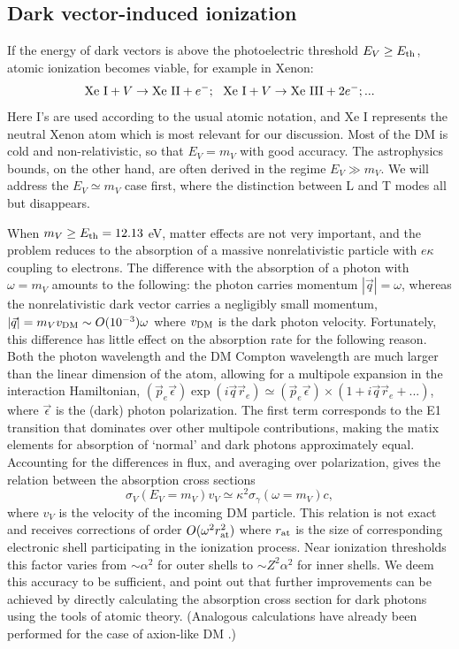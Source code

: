 \documentclass[prd,reprint,nofootinbib,notitlepage,aps,tightenlines,preprintnumbers,amsmath,amssymb,showpacs,superscriptaddress]{revtex4-1}
\begin{document}
\subsection{Dark vector-induced ionization}

If the energy of dark vectors is above the photoelectric threshold
$E_V \geq E_{\rm th}$, atomic ionization becomes viable, for example
in Xenon:
\begin{equation}
{\rm Xe~I} + V \to {\rm Xe~II} +e^-;~~{\rm Xe~I} + V \to {\rm Xe~III} +2e^-;...
\label{ion} 
\end{equation}
Here I's are used according to the usual atomic notation, and Xe I represents
the neutral Xenon atom which is most relevant for our discussion.
Most of the DM is cold and non-relativistic, so that $E_V = m_V$ with
good accuracy. The astrophysics bounds, on the other hand, are often
derived in the regime $E_V \gg m_V$. We will address the
$E_V \simeq m_V$ case first, where the distinction between L and T
modes all but disappears.

When $m_V \geq E_{\rm th}=12.13$ eV, matter effects are not very
important, and the problem reduces to the absorption of a massive
nonrelativistic particle with $e\kappa$ coupling to electrons. The
difference with the absorption of a photon with $\omega = m_V$ amounts
to the following: the photon carries momentum $|\vec{q}| =\omega$,
whereas the nonrelativistic dark vector carries a negligibly small
momentum, $|\vec{q}|= m_V  v_{\rm DM} \sim O(10^{-3})\omega$
where $v_{\rm DM}$ is the dark photon velocity. Fortunately, this
difference has little effect on the absorption rate for the following
reason. Both the photon wavelength and the DM Compton wavelength are
much larger than the linear dimension of the atom, allowing for a
multipole expansion in the interaction Hamiltonian,
$(\vec{p}_e \vec{\epsilon})\exp(i\vec{q}\vec{r}_e) \simeq (\vec{p}_e
\vec{\epsilon})\times(1 + i \vec{q}\vec{r}_e +...)$,
where $\vec{\epsilon}$ is the (dark) photon polarization. The first
term corresponds to the E1 transition that dominates over other
multipole contributions, making the matix elements for absorption of
`normal' and dark photons approximately equal.  Accounting for the
differences in flux, and averaging over polarization, gives the
relation between the absorption cross sections~\cite{Pospelov:2008jk}
\begin{equation}
\sigma_V(E_V=m_V)v_{V} \simeq \kappa^2\sigma_\gamma(\omega=m_V)c,
\label{relation}
\end{equation}
where $v_{V}$ is the velocity of the incoming DM particle.  This
relation is not exact and receives corrections of order
$O(\omega^2 r_{\rm at} ^2)$ where $r_{\rm at} $ is the size of
corresponding electronic shell participating in the ionization
process. Near ionization thresholds this factor varies from
$\sim \alpha^2$ for outer shells to $\sim Z^2 \alpha^2$ for inner
shells.  We deem this accuracy to be sufficient, and point out that
further improvements can be achieved by directly calculating the
absorption cross section for dark photons using the tools of atomic
theory. (Analogous calculations have already been performed for the
case of axion-like DM \cite{Dzuba:2010cw}.)
\end{document}
